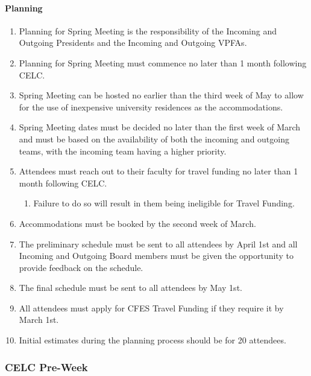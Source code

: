 \paragraph{Planning}
\begin{enumerate}
 \item
  Planning for Spring Meeting is the responsibility of the Incoming and Outgoing Presidents and the Incoming and Outgoing VPFAs.
 \item
  Planning for Spring Meeting must commence no later than 1 month following CELC.
 \item
  Spring Meeting can be hosted no earlier than the third week of May to allow for the use of inexpensive university residences as the accommodations.
 \item
  Spring Meeting dates must be decided no later than the first week of March and must be based on the availability of both the incoming and outgoing teams, with the incoming team having a higher priority.
 \item
  Attendees must reach out to their faculty for travel funding no later than 1 month following CELC.

  \begin{enumerate}
   \item
    Failure to do so will result in them being ineligible for Travel Funding.
  \end{enumerate}

 \item
  Accommodations must be booked by the second week of March.
 \item
  The preliminary schedule must be sent to all attendees by April 1st and all Incoming and Outgoing Board members must be given the opportunity to provide feedback on the schedule.
 \item
  The final schedule must be sent to all attendees by May 1st.
 \item
  All attendees must apply for CFES Travel Funding if they require it by March 1st.
 \item
  Initial estimates during the planning process should be for 20 attendees.
\end{enumerate}

\subsubsection{CELC Pre-Week}
\label{celc-pre-week}

